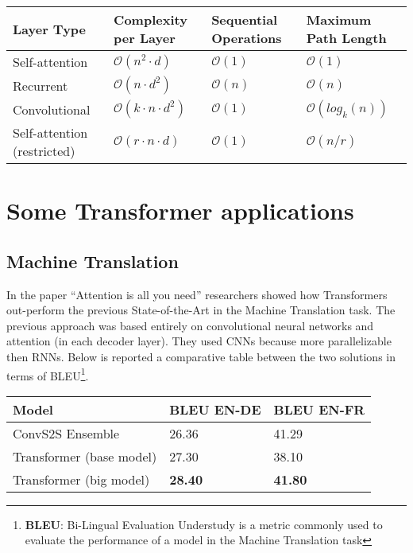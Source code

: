 \documentclass[11pt]{article}
\begin{document}
\begin{center}
\begin{longtable}{  p{5cm} p{4cm}  p{2cm} p{} }
\hline \hline 
Layer Type & Complexity per Layer & Sequential Operations & Maximum Path Length \\
\hline \hline 
Self-attention 			& $\mathcal{O}(n^2 \cdot d)$ 		& $\mathcal{O}(1)$	& $\mathcal{O}(1)$\\
Recurrent				& $\mathcal{O}(n \cdot d^2)$		& $\mathcal{O}(n)$	& $\mathcal{O}(n)$\\
Convolutional			& $\mathcal{O}(k \cdot n \cdot d^2)$	& $\mathcal{O}(1)$	& $\mathcal{O}(log_k (n))$\\
Self-attention (restricted)  & $\mathcal{O}(r \cdot n \cdot d)$	& $\mathcal{O}(1)$	& $\mathcal{O}(n/r)$\\
\hline
\end{longtable}
\end{center}

\newpage
\section{Some Transformer applications}

\subsection{Machine Translation} %
In the paper ``Attention is all you need'' researchers showed how Transformers out-perform the previous State-of-the-Art in the Machine Translation task. The previous approach\cite{cnnml} was based entirely on convolutional neural networks and attention (in each decoder layer). They used CNNs because more parallelizable then RNNs. Below is reported a comparative table between the two solutions in terms of BLEU\footnote{\textbf{BLEU}: Bi-Lingual Evaluation Understudy is a metric commonly used to evaluate the performance of a model in the Machine Translation task}. 

\begin{longtable}{ p{6cm}  p{3cm}   p{3cm}}
\hline \hline 
Model & BLEU EN-DE & BLEU EN-FR \\
\hline \hline 
ConvS2S Ensemble\cite{cnnml} 	& 26.36 & 41.29 \\
Transformer (base model) 		& 27.30 & 38.10 \\
Transformer (big model)			&  \textbf{28.40} & \textbf{41.80} \\
\hline
\end{longtable}
 
\end{document}
